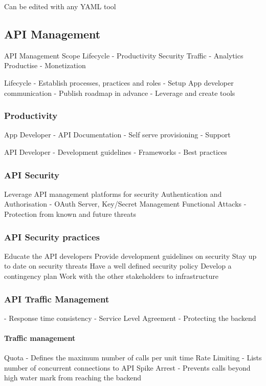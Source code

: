 Can be edited with any YAML tool

\subsection{API Management}

API Management Scope
Lifecycle - Productivity
Security
Traffic - Analytics
Productise - Monetization


Lifecycle
- Establish processes, practices and roles
- Setup App developer communication
- Publish roadmap in advance
- Leverage and create tools

\subsubsection{Productivity}
App Developer
- API Documentation
- Self serve provisioning
- Support

API Developer
- Development guidelines
- Frameworks
- Best practices

\subsubsection{API Security}
Leverage API management platforms for security
Authentication and Authorisation - OAuth Server, Key/Secret Management
Functional Attacks - Protection from known and future threats

\subsubsection{API Security practices}
Educate the API developers
Provide development guidelines on security
Stay up to date on security threats
Have a well defined security policy
Develop a contingency plan
Work with the other stakeholders to infrastructure

\subsubsection{API Traffic Management}
- Response time consistency
- Service Level Agreement
- Protecting the backend

\paragraph{Traffic management}
Quota - Defines the maximum number of calls per unit time
Rate Limiting - Lists number of concurrent connections to API
Spike Arrest - Prevents calls beyond high water mark from reaching the backend %

